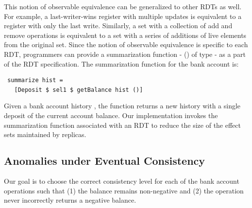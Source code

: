 This notion of observable equivalence can be generalized to other RDTs as well.
For example, a last-writer-wins register with multiple updates is equivalent to
a register with only the last write. Similarly, a set with a collection of add
and remove operations is equivalent to a set with a series of additions of live
elements from the original set. Since the notion of observable equivalence is
specific to each RDT, programmers can provide a summarization
function - () of type \cf{[e] -> [e]} -  as a part of
the RDT specification. The summarization function for the bank account is:

{\small
\begin{verbatim}
 summarize hist =
   [Deposit $ sel1 $ getBalance hist ()]
\end{verbatim}}

\noindent Given a bank account history , the 
function returns a new history with a single deposit of the current
account balance. Our implementation invokes the summarization function
associated with an RDT to reduce the size of the effect sets
maintained by replicas.

\subsection{Anomalies under Eventual Consistency}

Our goal is to choose the correct consistency level for each of the bank
account operations such that (1) the balance remains non-negative and (2) the
 operation never incorrectly returns a negative balance.

